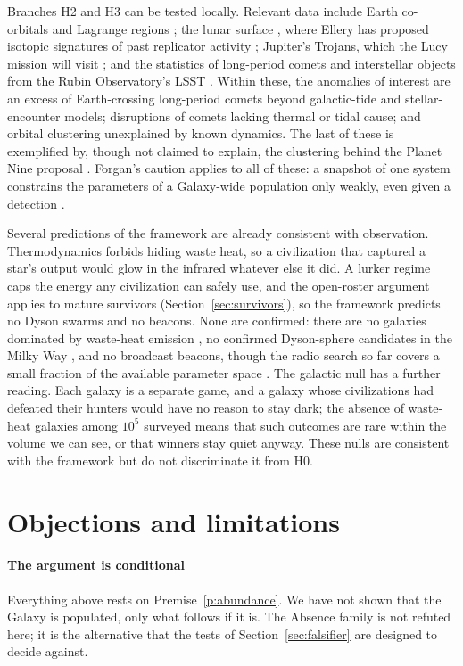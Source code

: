 \documentclass[preprint,12pt]{elsarticle}
\theoremstyle{definition}
\begin{document}
Branches H2 and H3 can be tested locally. Relevant data include Earth co-orbitals and Lagrange regions \citep{Benford2019,HaqqMisraKopparapu2012}; the lunar surface \citep{DaviesWagner2013}, where Ellery has proposed isotopic signatures of past replicator activity \citep{Ellery2025}; Jupiter's Trojans, which the Lucy mission will visit \citep{Levison2021}; and the statistics of long-period comets and interstellar objects from the Rubin Observatory's LSST \citep{Ivezic2019}. Within these, the anomalies of interest are an excess of Earth-crossing long-period comets beyond galactic-tide and stellar-encounter models; disruptions of comets lacking thermal or tidal cause; and orbital clustering unexplained by known dynamics. The last of these is exemplified by, though not claimed to explain, the clustering behind the Planet Nine proposal \citep{BatyginBrown2016}. Forgan's caution applies to all of these: a snapshot of one system constrains the parameters of a Galaxy-wide population only weakly, even given a detection \citep{Forgan2019}.

Several predictions of the framework are already consistent with observation. Thermodynamics forbids hiding waste heat, so a civilization that captured a star's output would glow in the infrared whatever else it did. A lurker regime caps the energy any civilization can safely use, and the open-roster argument applies to mature survivors (Section~\ref{sec:survivors}), so the framework predicts no Dyson swarms and no beacons. None are confirmed: there are no galaxies dominated by waste-heat emission \citep{Griffith2015}, no confirmed Dyson-sphere candidates in the Milky Way \citep{Suazo2024}, and no broadcast beacons, though the radio search so far covers a small fraction of the available parameter space \citep{Wright2018}. The galactic null has a further reading. Each galaxy is a separate game, and a galaxy whose civilizations had defeated their hunters would have no reason to stay dark; the absence of waste-heat galaxies among $10^{5}$ surveyed means that such outcomes are rare within the volume we can see, or that winners stay quiet anyway. These nulls are consistent with the framework but do not discriminate it from H0.

\section{Objections and limitations}
\label{sec:objections}

\paragraph{The argument is conditional}
Everything above rests on Premise~\ref{p:abundance}. We have not shown that the Galaxy is populated, only what follows if it is. The Absence family is not refuted here; it is the alternative that the tests of Section~\ref{sec:falsifier} are designed to decide against.
\end{document}
